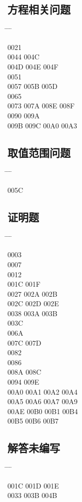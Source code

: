 \documentclass[twoside, twocolumn]{ctexart}
\newenvironment{problist}{
  \begin{center} \ttfamily \begin{tabbing}
      \hspace{50pt} \= \hspace{50pt} \= \hspace{50pt} \= \kill
  }{ \end{tabbing} \end{center} }
\begin{document}
  \subsection*{方程相关问题}

  \begin{problist}
    0021    \\ 0044   \> 004C \\
    004D \> 004E \> 004F  \\ 0051    \\
    0057 \> 005B \> 005D  \\ 0065    \\
    0073 \> 007A \> 008E \> 008F \\ 0090   \> 009A \\
    009B \> 009C \> 00A0 \> 00A3 \\
  \end{problist}

  \subsection*{取值范围问题}

  \begin{problist}
    005C   \\
  \end{problist}

  \subsection*{证明题}

  \begin{problist}
    0003    \\ 0007    \\
    0012    \\ 001C \> 001F   \\
    0027  \> 002A \> 002B \\ 002C \> 002D \> 002E  \\
    0038  \> 003A \> 003B \\ 003C    \\
    006A    \\ 007C \> 007D   \\
    0082    \\ 0086    \\
    008A \> 008C   \\ 0094   \> 009E \\
    00A0 \> 00A1 \> 00A2 \> 00A4 \\ 00A5 \> 00A6 \> 00A7 \> 00A9 \\
    00AE \> 00B0 \> 00B1 \> 00B4 \\ 00B5 \> 00B6 \> 00B7 \\
  \end{problist}

  \subsection*{解答未编写}

  \begin{problist}
    001C \> 001D \> 001E  \\ 0033 \> 003B \> 004B \\
  \end{problist}
\end{document}

